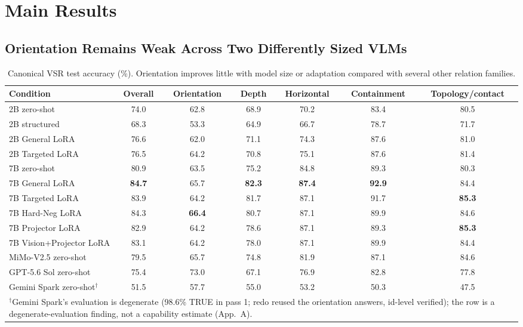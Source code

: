 \documentclass[10pt,twocolumn,letterpaper]{article}
\newcommand{\modelfrontier}{MiMo-V2.5}
\begin{document}
\section{Main Results}
\label{sec:results}
\subsection{Orientation Remains Weak Across Two Differently Sized VLMs}
\begin{table}[t]
\centering
\small
\caption{Canonical VSR test accuracy (\%). Orientation improves little with model size or adaptation compared with several other relation families.}
\label{tab:vsr-main}
\begin{tabular}{lcccccc}
\toprule
Condition & Overall & Orientation & Depth & Horizontal & Containment & Topology/contact \\
\midrule
2B zero-shot & 74.0 & 62.8 & 68.9 & 70.2 & 83.4 & 80.5 \\
2B structured & 68.3 & 53.3 & 64.9 & 66.7 & 78.7 & 71.7 \\
2B General LoRA & 76.6 & 62.0 & 71.1 & 74.3 & 87.6 & 81.0 \\
2B Targeted LoRA & 76.5 & 64.2 & 70.8 & 75.1 & 87.6 & 81.4 \\
7B zero-shot & 80.9 & 63.5 & 75.2 & 84.8 & 89.3 & 80.3 \\
7B General LoRA & \textbf{84.7} & 65.7 & \textbf{82.3} & \textbf{87.4} & \textbf{92.9} & 84.4 \\
7B Targeted LoRA & 83.9 & 64.2 & 81.7 & 87.1 & 91.7 & \textbf{85.3} \\
7B Hard-Neg LoRA & 84.3 & \textbf{66.4} & 80.7 & 87.1 & 89.9 & 84.6 \\
7B Projector LoRA & 82.9 & 64.2 & 78.6 & 87.1 & 89.3 & \textbf{85.3} \\
7B Vision+Projector LoRA & 83.1 & 64.2 & 78.0 & 87.1 & 89.9 & 84.4 \\
\modelfrontier{} zero-shot & 79.5 & 65.7 & 74.8 & 81.9 & 87.1 & 84.6 \\
GPT-5.6 Sol zero-shot & 75.4 & 73.0 & 67.1 & 76.9 & 82.8 & 77.8 \\
Gemini Spark zero-shot$^{\dagger}$ & 51.5 & 57.7 & 55.0 & 53.2 & 50.3 & 47.5 \\
\bottomrule
\multicolumn{7}{l}{\parbox{0.98\linewidth}{\footnotesize $^{\dagger}$Gemini Spark's evaluation is degenerate (98.6\% TRUE in pass 1; redo reused the orientation answers, id-level verified); the row is a degenerate-evaluation finding, not a capability estimate (App.~A).}}
\end{tabular}
\end{table}
\end{document}
